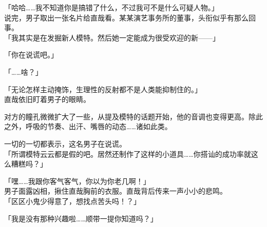 「哈哈……我不知道你是搞错了什么，不过我可不是什么可疑人物。」\\

说完，男子取出一张名片给直哉看。某某演艺事务所的董事，头衔似乎有那么回事。\\

「我其实是在发掘新人模特。然后她一定能成为很受欢迎的新——」

「你在说谎吧。」

「……啥？」

「无论怎样主动掩饰，生理性的反射都不是人类能抑制住的。」\\

直哉依旧盯着男子的眼睛。

对方的瞳孔微微扩大了一些，从提及模特的话题开始，他的音调也变得更高。除此之外，呼吸的节奏、出汗、嘴唇的动态……诸如此类。

一切的一切都表示，这名男子在说谎。\\

「所谓模特云云都是假的吧。居然还制作了这样的小道具……你搭讪的成功率就这么糟糕吗？」

「嘿……我跟你客气客气，你以为你老几啊！」\\

男子面露凶相，揪住直哉胸前的衣服。直哉背后传来一声小小的悲鸣。\\

「区区小鬼少得意了，想找点苦头吗！？」

「我是没有那种兴趣啦……顺带一提你知道吗？」

